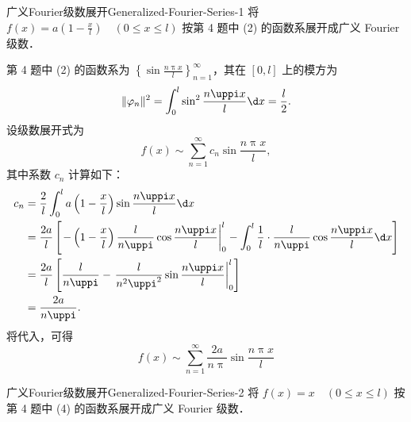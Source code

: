 \begin{problem}{广义Fourier级数展开}{Generalized-Fourier-Series-1}
    将 $f(x) = a \left(1 - \frac{x}{l}\right) \quad (0 \leqslant x \leqslant l)$ 按第 4 题中 (2) 的函数系展开成广义 Fourier 级数．
\end{problem}

\begin{solution}
    第 4 题中 (2) 的函数系为 $\left\{ \sin \frac{n\uppi x}{l} \right\}_{n=1}^{\infty}$，其在 $[0, l]$ 上的模方为
    \begin{equation}\label{eq:norm-5}
        \|\varphi_n\|^2 = \int_{0}^{l} \sin^2 \frac{n\uppi x}{l} \d x = \frac{l}{2}.
    \end{equation}
    设级数展开式为
    \begin{equation}\label{eq:series-5}
        f(x) \sim \sum_{n=1}^{\infty} c_n \sin \frac{n\uppi x}{l},
    \end{equation}
    其中系数 $c_n$ 计算如下：
    \begin{equation}\label{eq:coeff-5}
        \begin{aligned}
            c_n & = \frac{2}{l} \int_{0}^{l} a \left(1 - \frac{x}{l}\right) \sin \frac{n\uppi x}{l} \d x                                                                                                                      \\
                & = \frac{2a}{l} \left[ \left. -\left(1 - \frac{x}{l}\right) \frac{l}{n\uppi} \cos \frac{n\uppi x}{l} \right|_{0}^{l} - \int_{0}^{l} \frac{1}{l} \cdot \frac{l}{n\uppi} \cos \frac{n\uppi x}{l} \d x  \right] \\
                & = \frac{2a}{l} \left[ \frac{l}{n\uppi} - \left. \frac{l}{n^2\uppi^2} \sin \frac{n\uppi x}{l} \right|_{0}^{l} \right]                                                                                        \\
                & = \frac{2a}{n\uppi}.
        \end{aligned}
    \end{equation}
    将代入，可得
    \begin{equation}
        \boxed{f(x) \sim \sum_{n=1}^{\infty} \frac{2a}{n\uppi} \sin \frac{n\uppi x}{l}}
    \end{equation}
\end{solution}

\begin{problem}{广义Fourier级数展开}{Generalized-Fourier-Series-2}
    将 $f(x) = x \quad (0 \leqslant x \leqslant l)$ 按第 4 题中 (4) 的函数系展开成广义 Fourier 级数．
\end{problem}

